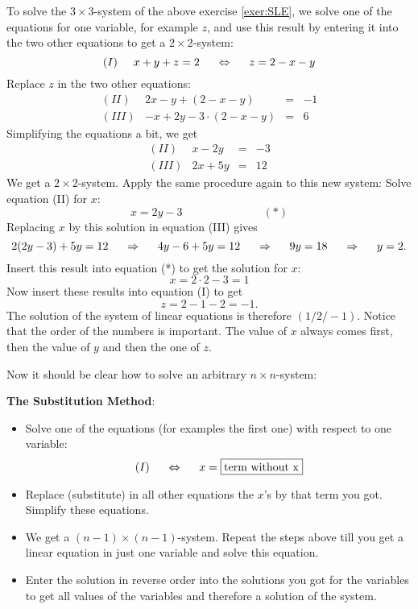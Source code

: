 \begin{example}
To solve the $3\times 3$-system of the above exercise \ref{exer:SLE}, we solve one of the equations for one variable, for example $z$, and use this result by entering it into the two other equations to get a $2\times 2$-system:
\[
(I)\hspace{5mm} x+y+z=2 \hspace{5mm}\Leftrightarrow\hspace{5mm} z=2-x-y
\]
Replace $z$ in the two other equations:
\[
\begin{array}{lrcl}
(II) &2x-y+(2-x-y)&=&-1\\
(III)  &-x+2y-3\cdot(2-x-y)&=&6
\end{array}
\]
Simplifying the equations a bit, we get
\[
\begin{array}{lrcl}
(II)&x-2y &=&-3 \\
(III)&2x+5y&=&12
\end{array}
\]
We get a $2\times 2$-system. Apply the same procedure again to this new system: Solve equation (II) for $x$: 
\[
x=2y-3 \hspace{3cm} (*)
\]
Replacing $x$ by this solution in equation (III) gives
\[
2(2y-3)+5y=12 \hspace{5mm}\Rightarrow\hspace{5mm} 4y-6+5y=12 \hspace{5mm}\Rightarrow\hspace{5mm} 9y=18 \hspace{5mm}\Rightarrow\hspace{5mm} y=2.
\]
Insert this result into equation (*) to get the solution for $x$:
\[
x=2\cdot 2-3=1
\]
Now insert these results into equation (I) to get
\[
z=2-1-2=-1.
\]
The solution of the system of linear equations is therefore $(1/2/-1)$. Notice that the order of the numbers is important. The value of $x$ always comes first, then the value of $y$ and then the one of $z$. 
\end{example}

\vsp\vsp

Now it should be clear how to solve an arbitrary $n\times n$-system:


\begin{tcolorbox}[colback=white]

\textbf{The Substitution Method}:

\begin{itemize}
\item	Solve one of the equations (for examples the first one) with respect to one variable:
\[(I) \hsp \Leftrightarrow \hsp x=\framebox[1.1\width][l]{\text{term without x}}\]
\item	Replace (substitute) in all other equations the $x$'s by that term you got. Simplify these equations.
\item We get a $(n-1)\times(n-1)$-system. Repeat the steps above till you get a linear equation in just one variable and solve this equation.
\item Enter the solution in reverse order into the solutions you got for the variables to get all values of the variables and therefore a solution of the system. 
\end{itemize}
\end{tcolorbox}

